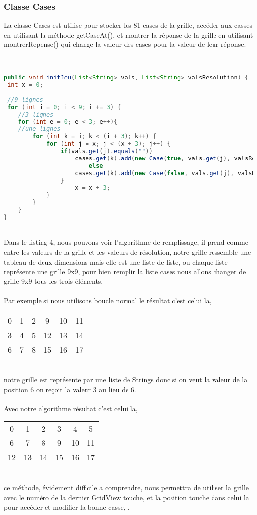 \documentclass{article}
\begin{document}
\subsubsection{Classe Cases}
La classe Cases est utilise pour stocker les 81 cases de la grille, accéder aux casses en utilisant la méthode getCaseAt(), et montrer la réponse de la grille en utilisant montrerReponse() qui change la valeur des cases pour la valeur de leur réponse. 
\\
\\
\begin{lstlisting}[language=Java, caption = Méthode pour le remplissage de cases] 

public void initJeu(List<String> vals, List<String> valsResolution) {
 int x = 0;
       
 //9 lignes
 for (int i = 0; i < 9; i += 3) {
    //3 lignes
    for (int e = 0; e < 3; e++){
    //une lignes
        for (int k = i; k < (i + 3); k++) {
            for (int j = x; j < (x + 3); j++) {
                if(vals.get(j).equals(""))
                    cases.get(k).add(new Case(true, vals.get(j), valsResolution.get(j)));
                        else
                    cases.get(k).add(new Case(false, vals.get(j), valsResolution.get(j)));
                }
                    x = x + 3;
            }
        }
    }
}
\end{lstlisting}
\\
Dans le listing 4, nous pouvons voir l'algorithme de remplissage, il prend comme entre les valeurs de la grille et les valeurs de résolution, notre grille ressemble une tableau de deux dimensions mais elle est une liste de liste, ou chaque liste représente une grille 9x9, pour bien remplir la liste cases nous allons changer de grille 9x9 tous les trois éléments.
\\
\\
Par exemple si nous utilisons boucle normal le résultat c'est celui la,
\begin{center}
\begin{tabular}{ c c c c c c}
 0 & 1 & 2 & 9 & 10 & 11\\ 
 3 & 4 & 5 & 12 & 13 & 14\\  
 6 & 7 & 8 & 15 & 16 & 17  
\end{tabular}
\end{center}
\\
notre grille est représente par une liste de Strings donc si on veut la valeur de la position 6 on reçoit la valeur 3 au lieu de 6.
\\
\\
Avec notre algorithme résultat c'est celui la,
\begin{center}
\begin{tabular}{ c c c c c c}
 0 & 1 & 2 & 3 & 4 & 5\\ 
 6 & 7 & 8 & 9 & 10 & 11 \\  
 12 & 13 & 14 & 15 & 16 & 17  
\end{tabular}
\end{center}
\\
ce méthode, évidement difficile a comprendre, nous permettra de utiliser la grille avec le numéro de la dernier GridView touche, et la position touche dans celui la pour accéder et modifier la bonne casse, .
\end{document}
